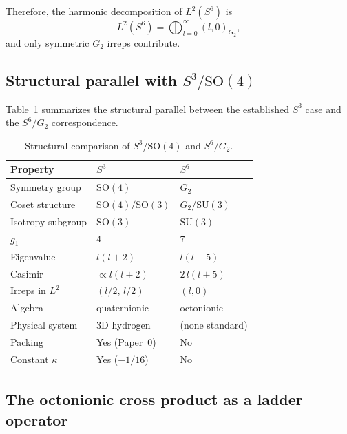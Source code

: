 \documentclass[twocolumn,pra,amsmath,amssymb,superscriptaddress]{revtex4-2}
\begin{document}
Therefore, the harmonic decomposition of $L^2(S^6)$ is
\begin{equation}
L^2(S^6) = \bigoplus_{l=0}^{\infty} (l,0)_{G_2},
\label{eq:peter_weyl}
\end{equation}
and only symmetric $G_2$ irreps contribute.

\subsection{Structural parallel with $S^3/\mathrm{SO}(4)$}

Table~\ref{tab:parallel} summarizes the structural parallel
between the established $S^3$ case and the $S^6/G_2$ correspondence.

\begin{table}
\caption{Structural comparison of $S^3/\mathrm{SO}(4)$ and
$S^6/G_2$.
\label{tab:parallel}}
\begin{ruledtabular}
\begin{tabular}{lll}
Property & $S^3$ & $S^6$ \\
\hline
Symmetry group    & $\mathrm{SO}(4)$ & $G_2$ \\
Coset structure   & $\mathrm{SO}(4)/\mathrm{SO}(3)$ &
                    $G_2/\mathrm{SU}(3)$ \\
Isotropy subgroup & $\mathrm{SO}(3)$ & $\mathrm{SU}(3)$ \\
$g_1$             & 4                & 7 \\
Eigenvalue        & $l(l+2)$         & $l(l+5)$ \\
Casimir           & $\propto l(l+2)$ & $2\,l(l+5)$ \\
Irreps in $L^2$   & $(l/2,\,l/2)$ & $(l,0)$ \\
Algebra           & quaternionic     & octonionic \\
Physical system   & 3D hydrogen      & (none standard) \\
Packing           & Yes (Paper~0)    & No \\
Constant $\kappa$ & Yes ($-1/16$)    & No \\
\end{tabular}
\end{ruledtabular}
\end{table}


\subsection{The octonionic cross product as a ladder operator}
\end{document}
